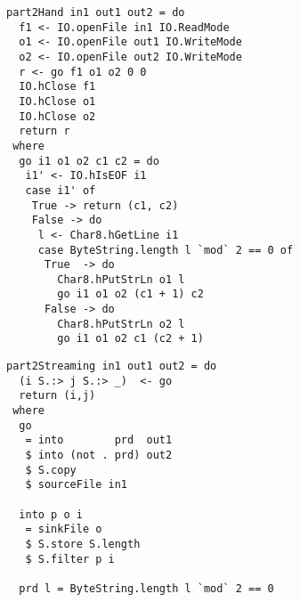 \begin{lstlisting}[float,label=l:a:bench:part2Hand,caption=Hand implementation of \Hs/part2/]
part2Hand in1 out1 out2 = do
  f1 <- IO.openFile in1 IO.ReadMode
  o1 <- IO.openFile out1 IO.WriteMode
  o2 <- IO.openFile out2 IO.WriteMode
  r <- go f1 o1 o2 0 0
  IO.hClose f1
  IO.hClose o1
  IO.hClose o2
  return r
 where
  go i1 o1 o2 c1 c2 = do
   i1' <- IO.hIsEOF i1
   case i1' of
    True -> return (c1, c2)
    False -> do
     l <- Char8.hGetLine i1
     case ByteString.length l `mod` 2 == 0 of
      True  -> do
        Char8.hPutStrLn o1 l
        go i1 o1 o2 (c1 + 1) c2
      False -> do
        Char8.hPutStrLn o2 l
        go i1 o1 o2 c1 (c2 + 1)
\end{lstlisting}

\begin{lstlisting}[float,label=l:a:bench:part2Streaming,caption=Streaming implementation of \Hs/part2/]
part2Streaming in1 out1 out2 = do
  (i S.:> j S.:> _)  <- go
  return (i,j)
 where
  go
   = into        prd  out1
   $ into (not . prd) out2
   $ S.copy
   $ sourceFile in1

  into p o i
   = sinkFile o
   $ S.store S.length
   $ S.filter p i

  prd l = ByteString.length l `mod` 2 == 0
\end{lstlisting}

